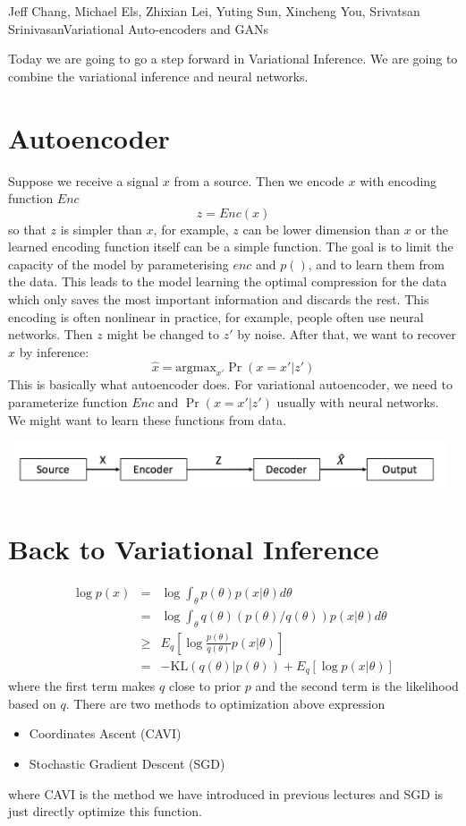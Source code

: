 \documentclass{article}
\begin{document}
 {Jeff Chang, Michael Els, Zhixian Lei, Yuting Sun, Xincheng You, Srivatsan Srinivasan}{Variational Auto-encoders and GANs}%

Today we are going to go a step forward in Variational Inference. We are going to combine the variational inference and neural networks. 
\section{Autoencoder}
Suppose we receive a signal $x$ from a source. Then we encode $x$ with encoding function $Enc$
$$ z = Enc(x) $$
so that $z$ is simpler than $x$, for example, $z$ can be lower dimension than $x$ or the learned encoding function itself can be a simple function. The goal is to limit the capacity of the model by parameterising $enc$ and $p()$, and to learn them from the data. This leads to the model learning the optimal compression for the data which only saves the most important information and discards the rest. This encoding is often nonlinear in practice, for example, people often use neural networks. Then $z$ might be changed to $z'$ by noise. After that, we want to recover $x$ by inference:
$$ \hat{x} = \textrm{argmax}_{x'}\Pr(x = x'|z') $$
This is basically what autoencoder does. For variational autoencoder, we need to parameterize function $Enc$ and $\Pr(x = x'|z')$ usually with neural networks. We might want to learn these functions from data. \\
\centerline{\includegraphics[width=13cm]{chart.png}}
\section{Back to Variational Inference}
\begin{eqnarray}
\log p(x) & = &\log \int_{\theta} p(\theta)p(x | \theta)d\theta \\
& = & \log \int_{\theta}q(\theta)(p(\theta)/q(\theta))p(x|\theta)d\theta \\
& \geq & E_q\left[\log \frac{p(\theta)}{q(\theta)}p(x|\theta)\right] \\
& = & -\textrm{KL}(q(\theta)|p(\theta)) + E_q[\log p(x|\theta)]
\end{eqnarray}
where the first term makes $q$ close to prior $p$ and the second term is the likelihood based on $q$.
There are two methods to optimization above expression
\begin{itemize}
\item Coordinates Ascent (CAVI)
\item Stochastic Gradient Descent (SGD)
\end{itemize}
where CAVI is the method we have introduced in previous lectures and SGD is just directly optimize this function.
\end{document}

